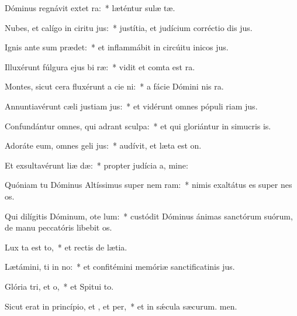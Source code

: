 \item Dóminus regnávit extet ra:~* læténtur sulæ tæ.
\item Nubes, et calígo in ciritu jus:~* justítia, et judícium corréctio dis jus.
\item Ignis ante sum prædet:~* et inflammábit in circúitu inicos jus.
\item Illuxérunt fúlgura ejus bi ræ:~* vidit et comta est ra.
\item Montes, sicut cera fluxérunt a cie ni:~* a fácie Dómini nis ra.
\item Annuntiavérunt cæli justiam jus:~* et vidérunt omnes pópuli riam jus.
\item Confundántur omnes, qui adrant sculpa:~* et qui gloriántur in simucris is.
\item Adoráte eum, omnes geli jus:~* audívit, et læta est on.
\item Et exsultavérunt liæ dæ:~* propter judícia a, mine:
\item Quóniam tu Dóminus Altíssimus super nem ram:~* nimis exaltátus es super nes os.
\item Qui dilígitis Dóminum, ote lum:~* custódit Dóminus ánimas sanctórum suórum, de manu peccatóris libebit os.
\item Lux ta est to,~* et rectis de lætia.
\item Lætámini, ti in no:~* et confitémini memóriæ sanctificatinis jus.
\item Glória tri, et o,~* et Spitui to.
\item Sicut erat in princípio, et , et per,~* et in sǽcula sæcurum. men.
